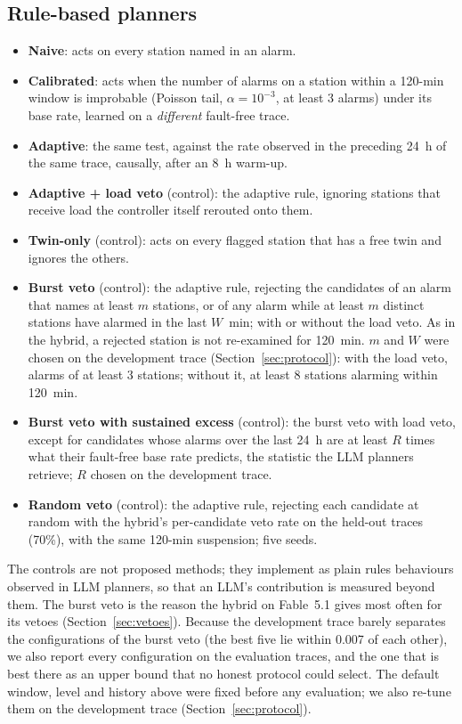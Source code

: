 \documentclass[preprint,11pt]{elsarticle}
\begin{document}
\subsection{Rule-based planners}
\begin{itemize}
  \item \textbf{Naive}: acts on every station named in an alarm.
  \item \textbf{Calibrated}: acts when the number of alarms on a station within a 120-min window is improbable (Poisson tail, $\alpha=10^{-3}$, at least 3 alarms) under its base rate, learned on a \emph{different} fault-free trace.
  \item \textbf{Adaptive}: the same test, against the rate observed in the preceding 24~h of the same trace, causally, after an 8~h warm-up.
  \item \textbf{Adaptive + load veto} (control): the adaptive rule, ignoring stations that receive load the controller itself rerouted onto them.
  \item \textbf{Twin-only} (control): acts on every flagged station that has a free twin and ignores the others.
  \item \textbf{Burst veto} (control): the adaptive rule, rejecting the candidates of an alarm that names at least $m$ stations, or of any alarm while at least $m$ distinct stations have alarmed in the last $W$~min; with or without the load veto. As in the hybrid, a rejected station is not re-examined for 120~min. $m$ and $W$ were chosen on the development trace (Section~\ref{sec:protocol}): with the load veto, alarms of at least 3 stations; without it, at least 8 stations alarming within 120~min.
  \item \textbf{Burst veto with sustained excess} (control): the burst veto with load veto, except for candidates whose alarms over the last 24~h are at least $R$ times what their fault-free base rate predicts, the statistic the LLM planners retrieve; $R$ chosen on the development trace.
  \item \textbf{Random veto} (control): the adaptive rule, rejecting each candidate at random with the hybrid's per-candidate veto rate on the held-out traces (70\%), with the same 120-min suspension; five seeds.
\end{itemize}
The controls are not proposed methods; they implement as plain rules behaviours observed in LLM planners, so that an LLM's contribution is measured beyond them. The burst veto is the reason the hybrid on Fable~5.1 gives most often for its vetoes (Section~\ref{sec:vetoes}). Because the development trace barely separates the configurations of the burst veto (the best five lie within 0.007 of each other), we also report every configuration on the evaluation traces, and the one that is best there as an upper bound that no honest protocol could select. The default window, level and history above were fixed before any evaluation; we also re-tune them on the development trace (Section~\ref{sec:protocol}).
\end{document}
